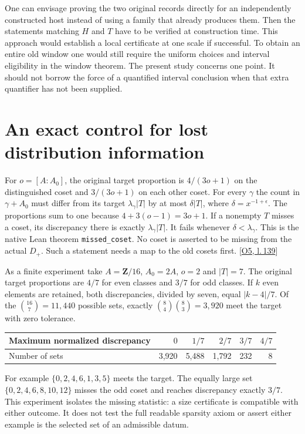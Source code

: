 \documentclass[12pt,letterpaper]{article}
\newcommand{\id}[1]{{\small\nolinkurl{#1}}}
\begin{document}
One can envisage proving the two original records directly for an independently constructed host instead of using a family that already produces them. Then the statements matching $H$ and $T$ have to be verified at construction time. This approach would establish a local certificate at one scale if successful. To obtain an entire old window one would still require the uniform choices and interval eligibility in the window theorem. The present study concerns one point. It should not borrow the force of a quantified interval conclusion when that extra quantifier has not been supplied.

\section{An exact control for lost distribution information}
For $o=[A:A_0]$, the original target proportion is $4/(3o+1)$ on the distinguished coset and $3/(3o+1)$ on each other coset. For every $\gamma$ the count in $\gamma+A_0$ must differ from its target $\lambda_\gamma |T|$ by at most $\delta |T|$, where $\delta=x^{-1+\epsilon}$. The proportions sum to one because $4+3(o-1)=3o+1$. If a nonempty $T$ misses a coset, its discrepancy there is exactly $\lambda_\gamma |T|$. It fails whenever $\delta<\lambda_\gamma$. This is the native Lean theorem \id{missed_coset}. No coset is asserted to be missing from the actual $D_+$. Such a statement needs a map to the old cosets first. {\footnotesize\sffamily\color{mute}[\href{https://github.com/nousentllc/riemann-hypothesis/blob/40e56bab026552e089d7afcfeff08d2defb9c005/src/Formalism/SharpRestriction/RamificationFrobenius/TotientGaloisClasses/ExplicitFormulaErrorOfHostConditions.lean\#L139}{O5, l.\,139}]}

As a finite experiment take $A=\mathbf Z/16$, $A_0=2A$, $o=2$ and $|T|=7$. The original target proportions are $4/7$ for even classes and $3/7$ for odd classes. If $k$ even elements are retained, both discrepancies, divided by seven, equal $|k-4|/7$. Of the $\binom{16}7=11{,}440$ possible sets, exactly $\binom84\binom83=3{,}920$ meet the target with zero tolerance.
\begin{center}\small
\begin{tabular}{@{}lrrrrr@{}}\toprule
Maximum normalized discrepancy & $0$ & $1/7$ & $2/7$ & $3/7$ & $4/7$\\\midrule
Number of sets & 3,920 & 5,488 & 1,792 & 232 & 8\\\bottomrule
\end{tabular}\end{center}
For example $\{0,2,4,6,1,3,5\}$ meets the target. The equally large set $\{0,2,4,6,8,10,12\}$ misses the odd coset and reaches discrepancy exactly $3/7$. This experiment isolates the missing statistic: a size certificate is compatible with either outcome. It does not test the full readable sparsity axiom or assert either example is the selected set of an admissible datum.
\end{document}
